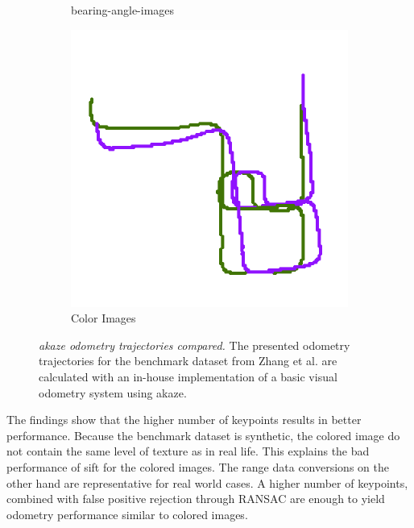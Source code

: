 \begin{figure}[b!]
\begin{subfigure}[t]{0.31\linewidth}
    \caption{\glspl{bearing-angle-image}}
\end{subfigure}%
\begin{subfigure}[t]{0.31\linewidth}
    \includegraphics[width=\linewidth]{chapter06/odo/zhang_pinhole_AKAZE_nice.png}%
    \caption{Color Images}
\end{subfigure}
\caption[\acrshort{akaze} odometry trajectories compared]{\emph{\acrshort{akaze} odometry trajectories compared.} The presented odometry trajectories for the benchmark dataset from Zhang et al.\cite{zhang_icra2016} are calculated with an in-house implementation of a basic visual odometry system using \acrshort{akaze}.}\label{fig:akaze_odometry}
\end{figure}
The findings show that the higher number of keypoints results in better performance.
Because the benchmark dataset is synthetic, the colored image do not contain the same level of texture as in real life.
This explains the bad performance of \acrshort{sift} for the colored images.
The range data conversions on the other hand are representative for real world cases.
A higher number of keypoints, combined with false positive rejection through \acrshort{RANSAC} are enough to yield odometry performance similar to colored images.
